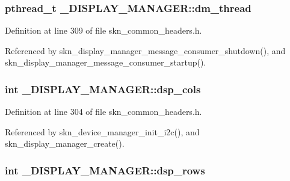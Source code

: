 \subsubsection[{dm\+\_\+thread}]{\setlength{\rightskip}{0pt plus 5cm}pthread\+\_\+t \+\_\+\+D\+I\+S\+P\+L\+A\+Y\+\_\+\+M\+A\+N\+A\+G\+E\+R\+::dm\+\_\+thread}\label{struct___d_i_s_p_l_a_y___m_a_n_a_g_e_r_a7033f795cd887063d36c11556c368e6f}


Definition at line 309 of file skn\+\_\+common\+\_\+headers.\+h.



Referenced by skn\+\_\+display\+\_\+manager\+\_\+message\+\_\+consumer\+\_\+shutdown(), and skn\+\_\+display\+\_\+manager\+\_\+message\+\_\+consumer\+\_\+startup().

\hypertarget{struct___d_i_s_p_l_a_y___m_a_n_a_g_e_r_a8ea0b9503de7da47f210489c8fa19867}{}
\subsubsection[{dsp\+\_\+cols}]{\setlength{\rightskip}{0pt plus 5cm}int \+\_\+\+D\+I\+S\+P\+L\+A\+Y\+\_\+\+M\+A\+N\+A\+G\+E\+R\+::dsp\+\_\+cols}\label{struct___d_i_s_p_l_a_y___m_a_n_a_g_e_r_a8ea0b9503de7da47f210489c8fa19867}


Definition at line 304 of file skn\+\_\+common\+\_\+headers.\+h.



Referenced by skn\+\_\+device\+\_\+manager\+\_\+init\+\_\+i2c(), and skn\+\_\+display\+\_\+manager\+\_\+create().

\hypertarget{struct___d_i_s_p_l_a_y___m_a_n_a_g_e_r_aeddcffcc90a611efde00a085352bc63b}{}
\subsubsection[{dsp\+\_\+rows}]{\setlength{\rightskip}{0pt plus 5cm}int \+\_\+\+D\+I\+S\+P\+L\+A\+Y\+\_\+\+M\+A\+N\+A\+G\+E\+R\+::dsp\+\_\+rows}\label{struct___d_i_s_p_l_a_y___m_a_n_a_g_e_r_aeddcffcc90a611efde00a085352bc63b}



